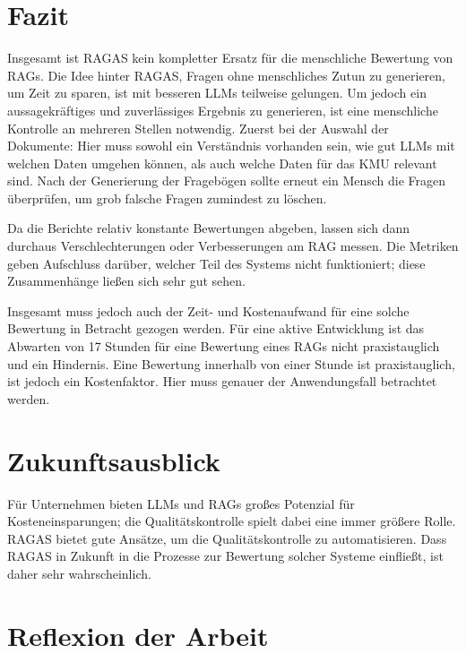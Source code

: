 \section{Fazit}
Insgesamt ist RAGAS kein kompletter Ersatz für die menschliche Bewertung von RAGs. Die Idee hinter RAGAS, Fragen ohne menschliches Zutun zu generieren, um Zeit zu sparen, ist mit besseren LLMs teilweise gelungen.
Um jedoch ein aussagekräftiges und zuverlässiges Ergebnis zu generieren, ist eine menschliche Kontrolle an mehreren Stellen notwendig.
Zuerst bei der Auswahl der Dokumente: Hier muss sowohl ein Verständnis vorhanden sein, wie gut LLMs mit welchen Daten umgehen können, als auch welche Daten für das KMU relevant sind.
Nach der Generierung der Fragebögen sollte erneut ein Mensch die Fragen überprüfen, um grob falsche Fragen zumindest zu löschen.

Da die Berichte relativ konstante Bewertungen abgeben, lassen sich dann durchaus Verschlechterungen oder Verbesserungen am RAG messen.
Die Metriken geben Aufschluss darüber, welcher Teil des Systems nicht funktioniert; diese Zusammenhänge ließen sich sehr gut sehen.

Insgesamt muss jedoch auch der Zeit- und Kostenaufwand für eine solche Bewertung in Betracht gezogen werden.
Für eine aktive Entwicklung ist das Abwarten von 17 Stunden für eine Bewertung eines RAGs nicht praxistauglich und ein Hindernis.
Eine Bewertung innerhalb von einer Stunde ist praxistauglich, ist jedoch ein Kostenfaktor. Hier muss genauer der Anwendungsfall betrachtet werden.

\section{Zukunftsausblick}

Für Unternehmen bieten LLMs und RAGs großes Potenzial für Kosteneinsparungen; die Qualitätskontrolle spielt dabei eine immer größere Rolle.
RAGAS bietet gute Ansätze, um die Qualitätskontrolle zu automatisieren. Dass RAGAS in Zukunft in die Prozesse zur Bewertung solcher Systeme einfließt, ist daher sehr wahrscheinlich.

\section{Reflexion der Arbeit}